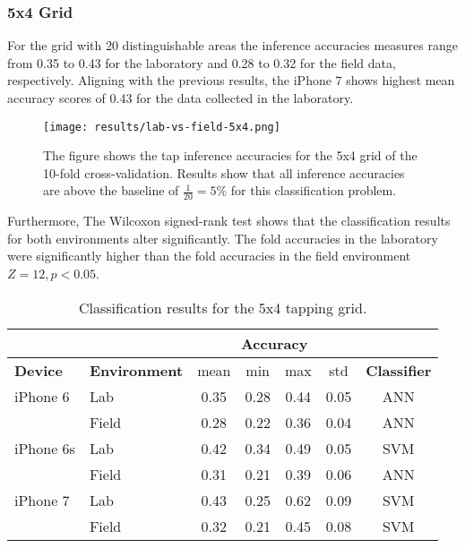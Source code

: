 \subsubsection{5x4 Grid}
For the grid with 20 distinguishable areas the inference accuracies measures range from 0.35 to 0.43 for the laboratory and 0.28 to 0.32 for the field data, respectively. Aligning with the previous results, the iPhone 7 shows highest mean accuracy scores of 0.43 for the data collected in the laboratory. 

\begin{figure}[h!]
  \centering
  \texttt{[image: results/lab-vs-field-5x4.png]}
  \caption{The figure shows the tap inference accuracies for the 5x4 grid of the 10-fold cross-validation. Results show that all inference accuracies are above the baseline of $\frac{1}{20} = 5\%$ for this classification problem.} \label{fig:results-lf-5x4}
\end{figure}



Furthermore, The Wilcoxon signed-rank test shows that the classification results for both environments alter significantly. The fold accuracies in the laboratory were significantly higher than the fold accuracies in the field environment $Z = 12, p < 0.05$.

\begin{table}[h!]
  \centering
  \begin{tabular}{|l|l|c|c|c|c|c|}
    \cline{3-6}
    \multicolumn{2}{c}{} & \multicolumn{4}{|c|}{\textbf{Accuracy}}  \\
    \hline
    \textbf{Device} & \textbf{Environment} & mean &   min &   max  & std &  \textbf{Classifier} \\
    \hline
    iPhone 6 & Lab &      0.35 &     0.28 &     0.44 &     0.05 &  ANN \\
    & Field &      0.28 &     0.22 &     0.36 &     0.04 &  ANN \\
    \hline
    iPhone 6s & Lab &      0.42 &     0.34 &     0.49 &     0.05 &  SVM \\
    &   Field    &    0.31 &     0.21 &     0.39 &     0.06 &  ANN \\
    \hline
    iPhone 7 & Lab &      0.43 &     0.25 &     0.62 &     0.09 &  SVM \\
    & Field &      0.32 &     0.21 &     0.45 &     0.08 &  SVM \\    
    \hline
  \end{tabular}
  \caption{Classification results for the 5x4 tapping grid.}
\end{table}



